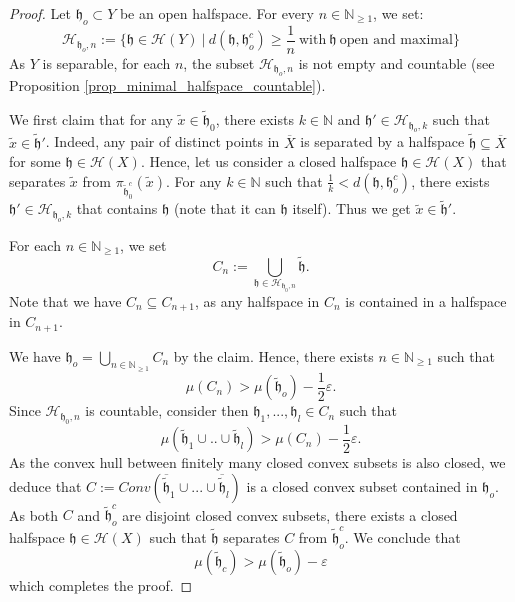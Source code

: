 \documentclass{amsart}
\numberwithin{equation}{section}
\newcommand{\HH}{\mathcal{H}}     %
\newcommand{\hh}{\mathfrak{h}}    %
\newcommand{\NN}{\mathbb{N}}      %
\theoremstyle{definition}
\def\bar{\overline}
\begin{document}
\begin{proof}
  Let $\hh_o\subset Y$ be an open halfspace. For every $n\in\NN_{\geq 1}$, we set:
  \[
  \HH_{\hh_o,n}:=\{\hh\in \HH(Y)\ | \ d(\hh,\hh_o^c)\geq\frac{1}{n}\ \text{with}\ \hh\  \text{open and maximal}\}
  \]
As $Y$ is separable, for each $n$, the subset $\HH_{\hh_o,n}$ is not empty and countable (see Proposition \ref{prop_minimal_halfspace_countable}). \par
We first claim that for any $\tilde{x}\in \tilde{\hh}_0$, there exists $k\in\NN$ and $\hh' \in \HH_{\hh_o,k}$ such that $\tilde{x}\in\tilde{\hh}'$. Indeed, any pair of distinct points in $\bar{X}$ is separated by a halfspace $\tilde{\hh}\subseteq \bar{X}$ for some $\hh\in \HH(X)$. Hence, let us consider a closed halfspace $\hh\in\HH(X)$ that separates $\tilde{x}$ from $\pi_{\tilde{\hh}_0^c}(\tilde{x})$. For any $k\in\NN$ such that $\frac{1}{k}<d(\hh,\hh_o^c)$, there exists $\hh'\in\HH_{\hh_o,k}$ that contains $\hh$ (note that it can $\hh$ itself). Thus we get $\tilde{x}\in\tilde{\hh}'$.\par 
For each $n\in\NN_{\geq 1}$, we set
\[
C_n:=\bigcup_{\hh\in\HH_{\hh_0,n}}\tilde{\hh}.
\]
Note that we have $C_n\subseteq C_{n+1}$, as any halfspace in $C_n$ is contained in a halfspace in $C_{n+1}$.\par
We have $\hh_o=\displaystyle{\bigcup_{n\in\NN_{\geq 1}} C_n}$ by the claim. Hence, there exists $n\in\NN_{\geq 1}$ such that 
\[
\mu(C_n)>\mu(\tilde{\hh}_o)-\frac{1}{2}\varepsilon.
\]
Since $\HH_{\hh_0,n}$ is countable, consider then $\hh_1,...,\hh_l\in C_n$ such that 
\[
\mu(\tilde{\hh}_1\cup..\cup\tilde{\hh}_l)>\mu(C_n)-\frac{1}{2}\varepsilon.
\]
As the convex hull between finitely many closed convex subsets is also closed, we deduce that $C:=Conv(\bar {\tilde{\hh}}_1\cup ...\cup\bar{\tilde{\hh}}_l)$ is a closed convex subset contained in $\hh_o$. As both $C$ and $\tilde{\hh}_o^c$ are disjoint closed convex subsets, there exists a closed halfspace $\hh\in\HH(X)$ such that $\tilde{\hh}$ separates $C$ from $\tilde{\hh}_o^c$. We conclude that 
\[
\mu(\tilde{\hh}_c)>\mu(\tilde{\hh}_o)-\varepsilon
\]
which completes the proof.
\end{proof}
\end{document}
